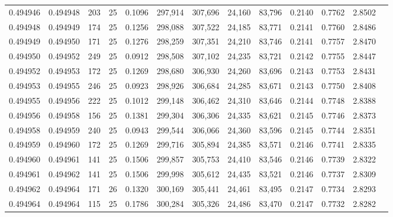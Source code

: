 \begin{tabular}{rrrrrrrrrrrrr}
0.494946 & 0.494948 &   203 &  25 &                                     0.1096 & 297,914 & 307,696 &  24,160 &  83,796 & 0.2140 & 0.7762 & 2.8502 \\
0.494948 & 0.494949 &   174 &  25 &                                     0.1256 & 298,088 & 307,522 &  24,185 &  83,771 & 0.2141 & 0.7760 & 2.8486 \\
0.494949 & 0.494950 &   171 &  25 &                                     0.1276 & 298,259 & 307,351 &  24,210 &  83,746 & 0.2141 & 0.7757 & 2.8470 \\
0.494950 & 0.494952 &   249 &  25 &                                     0.0912 & 298,508 & 307,102 &  24,235 &  83,721 & 0.2142 & 0.7755 & 2.8447 \\
0.494952 & 0.494953 &   172 &  25 &                                     0.1269 & 298,680 & 306,930 &  24,260 &  83,696 & 0.2143 & 0.7753 & 2.8431 \\
0.494953 & 0.494955 &   246 &  25 &                                     0.0923 & 298,926 & 306,684 &  24,285 &  83,671 & 0.2143 & 0.7750 & 2.8408 \\
0.494955 & 0.494956 &   222 &  25 &                                     0.1012 & 299,148 & 306,462 &  24,310 &  83,646 & 0.2144 & 0.7748 & 2.8388 \\
0.494956 & 0.494958 &   156 &  25 &                                     0.1381 & 299,304 & 306,306 &  24,335 &  83,621 & 0.2145 & 0.7746 & 2.8373 \\
0.494958 & 0.494959 &   240 &  25 &                                     0.0943 & 299,544 & 306,066 &  24,360 &  83,596 & 0.2145 & 0.7744 & 2.8351 \\
0.494959 & 0.494960 &   172 &  25 &                                     0.1269 & 299,716 & 305,894 &  24,385 &  83,571 & 0.2146 & 0.7741 & 2.8335 \\
0.494960 & 0.494961 &   141 &  25 &                                     0.1506 & 299,857 & 305,753 &  24,410 &  83,546 & 0.2146 & 0.7739 & 2.8322 \\
0.494961 & 0.494962 &   141 &  25 &                                     0.1506 & 299,998 & 305,612 &  24,435 &  83,521 & 0.2146 & 0.7737 & 2.8309 \\
0.494962 & 0.494964 &   171 &  26 &                                     0.1320 & 300,169 & 305,441 &  24,461 &  83,495 & 0.2147 & 0.7734 & 2.8293 \\
0.494964 & 0.494964 &   115 &  25 &                                     0.1786 & 300,284 & 305,326 &  24,486 &  83,470 & 0.2147 & 0.7732 & 2.8282 \\

\end{tabular}
